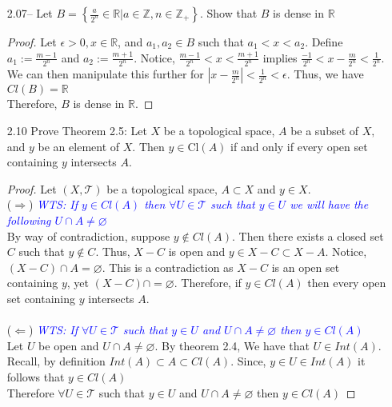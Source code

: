 \documentclass[12pt]{article}
\newcommand{\R}{\mathbb{R}}
\newcommand{\TT}{\mathcal{T}}
\newcommand{\wts}[1]{\textit{\textcolor{blue}{WTS: #1}}\\}
\begin{document}
\begin{enumerate}
		\item[2.07--] Let $B=\left\{\frac{a}{2^{n}} \in \mathbb{R} | a \in \mathbb{Z}, n \in \mathbb{Z}_{+}\right\} .$ Show that $B$ is dense in $\mathbb{R}$\\
		\begin{proof}
		Let $ \epsilon > 0 , x\in \R $, and $ a_1,a_2\in B $ such that $ a_1<x<a_2 $. Define $ a_1 := \frac{m-1}{2^n} $ and $ a_2:=\frac{m+1}{2^n} $. Notice, $ \frac{m-1}{2^n} < x < \frac{m+1}{2^n} $ implies $ \frac{-1}{2^n} < x - \frac{m}{2^n} < \frac{1}{2^n}$. We can then manipulate this further for $ |x-\frac{m}{2^n} | < \frac{1}{2^n} < \epsilon$. Thus, we have $ Cl(B) = \R $\\
		Therefore, $ B $ is dense in $ \R $.
		\end{proof}

		
		\item[2.10] Prove Theorem 2.5: Let $X$ be a topological space, $A$ be a subset of $X,$ and $y$ be an element of $X .$ Then $y \in \mathrm{Cl}(A)$ if and only if every open set containing $y$ intersects $A$.
		\begin{proof}
			Let $ (X,\TT) $ be a topological space, $ A\subset X $ and $ y\in X $.\\
			($ \Rightarrow $) \wts{If $ y\in Cl(A) $ then $ \forall U \in \TT $ such that $ y\in U $ we will have the following $ U\cap A \not= \varnothing $}
			By way of contradiction, suppose $ y\not\in Cl(A) $. Then there exists a closed set $ C $ such that $ y\not\in C$. Thus, $ X-C $ is open and $ y\in X-C \subset X-A $. Notice, $ (X-C)\cap A = \varnothing $. This is a contradiction as $ X-C $ is an open set containing $ y $, yet $ (X-C)\cap = \varnothing $. 
			Therefore, if $ y\in Cl(A) $ then every open set containing $y$ intersects $A$.\\
			\\
			($\Leftarrow$) \wts{If $ \forall U \in \TT  $ such that $ y\in U $ and $ U\cap A \not= \varnothing $ then $ y\in Cl(A) $}
			Let $U$ be open and $ U\cap A \not= \varnothing $. By theorem 2.4, We have that $ U \in Int(A) $. Recall, by definition $ Int(A) \subset A \subset Cl(A) $. Since, $ y\in U \in Int(A) $ it follows that $ y\in Cl(A) $\\
			Therefore $ \forall U \in \TT  $ such that $ y\in U $ and $ U\cap A \not= \varnothing $ then $ y\in Cl(A) $
		\end{proof}
		

\end{enumerate}
\end{document}
